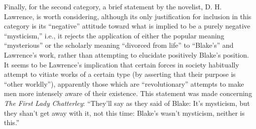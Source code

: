 Finally, for the second category, a brief statement by the novelist, D. H. Lawrence, is worth
considering, although its only justification for inclusion in this category is its \enquote{negative} attitude toward what is
implied to be a purely negative \enquote{mysticism,} i.e., it rejects the application of either the popular meaning \enquote{mysterious} or the
scholarly meaning \enquote{divorced from life} to \enquote{Blake's} and Lawrence's work, rather
than attempting to elucidate positively Blake's position. It seems to be Lawrence's implication that certain
forces in society habitually attempt to vitiate works of a certain type (by asserting that their purpose is \enquote{other worldly}), apparently
those which are \enquote{revolutionary} attempts to make men more intensely aware of their existence. This statement was made concerning
\emph{The First Lady Chatterley}: \enquote{They'll say as they said of Blake: It's mysticism, but they shan't get away with it, not this time: Blake's
wasn't mysticism, neither is this.}\supercite{lawrence:first-lady-chatterly}

